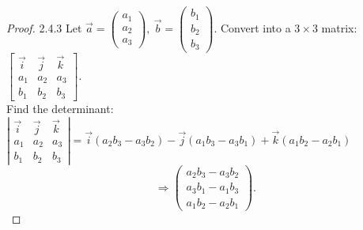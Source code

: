 \documentclass[12pt, a4paper]{article}
\begin{document}
\begin{enumerate}
\begin{proof}{2.4.3}{}
    Let $\vec{a}=\begin{pmatrix}a_1\\a_2\\a_3\end{pmatrix},\ \vec{b}=\begin{pmatrix}b_1\\b_2\\b_3\end{pmatrix}$. Convert into a $3\times 3$ matrix: $\begin{bmatrix}\vec{i}&\vec{j}&\vec{k}\\a_1&a_2&a_3\\b_1&b_2&b_3\end{bmatrix}.$\\
    Find the determinant: $\left|\begin{matrix}\vec{i}&\vec{j}&\vec{k}\\a_1&a_2&a_3\\b_1&b_2&b_3\end{matrix}\right|=\vec{i}(a_2b_3-a_3b_2)-\vec{j}(a_1b_3-a_3b_1)+\vec{k}(a_1b_2-a_2b_1)$
    $$\Rightarrow \begin{pmatrix}a_2b_3-a_3b_2\\a_3b_1-a_1b_3\\a_1b_2-a_2b_1\end{pmatrix}.$$
  \end{proof}
\end{enumerate}
\end{document}

